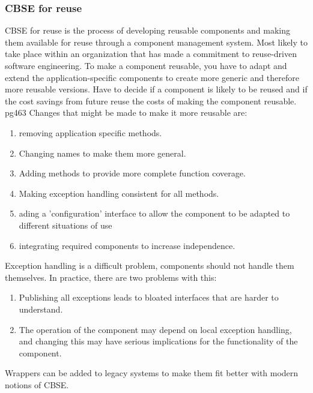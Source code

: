 \documentclass{article}
\begin{document}
\subsubsection{CBSE for reuse}
CBSE for reuse is the process of developing reusable components and making them available for reuse through a component management system.
Most likely to take place within an organization that has made a commitment to reuse-driven software engineering.
To make a component reusable, you have to adapt and extend the application-specific components to create more generic and therefore more reusable versions.
Have to decide if a component is likely to be reused and if the cost savings from future reuse the costs of making the component reusable. pg463
Changes that might be made to make it more reusable are:
\begin{enumerate}
\item removing application specific methods.
\item Changing names to make them more general.
\item Adding methods to provide more complete function coverage.
\item Making exception handling consistent for all methods.
\item ading a 'configuration' interface to allow the component to be adapted to different situations of use
\item integrating required components to increase independence.
\end{enumerate}
Exception handling is a difficult problem, components should not handle them themselves.  In practice, there are two problems with this:
\begin{enumerate}
\item Publishing all exceptions leads to bloated interfaces that are harder to understand.
\item The operation of the component may depend on local exception handling, and changing this may have serious implications for the functionality of the component.
\end{enumerate}

Wrappers can be added to legacy systems to make them fit better with modern notions of CBSE.
\end{document}

